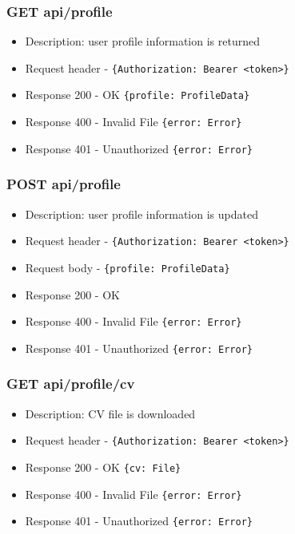 \subsubsection{GET api/profile}
\begin{itemize}
    \item Description: user profile information is returned
    \item Request header - \verb|{Authorization: Bearer <token>}|
    \item Response 200 - OK \verb|{profile: ProfileData}|
    \item Response 400 - Invalid File \verb|{error: Error}|
    \item Response 401 - Unauthorized \verb|{error: Error}|
\end{itemize}

\subsubsection{POST api/profile}
\begin{itemize}
    \item Description: user profile information is updated
    \item Request header - \verb|{Authorization: Bearer <token>}|
    \item Request body - \verb|{profile: ProfileData}|
    \item Response 200 - OK
    \item Response 400 - Invalid File \verb|{error: Error}|
    \item Response 401 - Unauthorized \verb|{error: Error}|
\end{itemize}

\subsubsection{GET api/profile/cv}
\begin{itemize}
    \item Description: CV file is downloaded
    \item Request header - \verb|{Authorization: Bearer <token>}|
    \item Response 200 - OK \verb|{cv: File}|
    \item Response 400 - Invalid File \verb|{error: Error}|
    \item Response 401 - Unauthorized \verb|{error: Error}|
\end{itemize}

